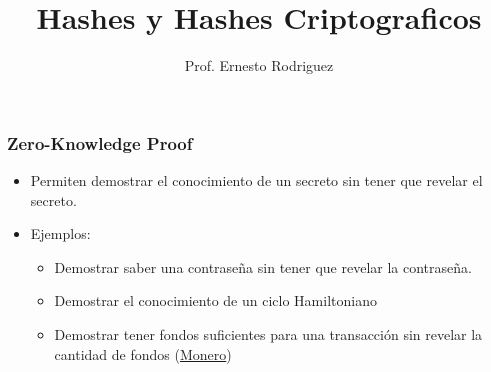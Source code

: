 \documentclass{beamer}
\title{Hashes y Hashes Criptograficos}
\author{Prof. Ernesto Rodriguez}
\institute{
    Universidad del Itsmo \\
    \medskip \textit{erodriguez@unis.edu.gt}
}
\date[\today]{}
\begin{document}
\begin{frame}
\titlepage
\end{frame}

\begin{frame}
    \frametitle{Zero-Knowledge Proof}
    \begin{itemize}
        \item{Permiten demostrar el conocimiento de un
        secreto sin tener que revelar el secreto.}
        \item{Ejemplos:
        \begin{itemize}
            \item{Demostrar saber una contrase\~na sin tener que revelar la contrase\~na.}
            \item{Demostrar el conocimiento de un ciclo Hamiltoniano}
            \item{Demostrar tener fondos suficientes para una transacci\'on sin revelar
            la cantidad de fondos (\href{https://getmonero.org/}{Monero})}
        \end{itemize}}
    \end{itemize}
\end{frame}
\end{document}
